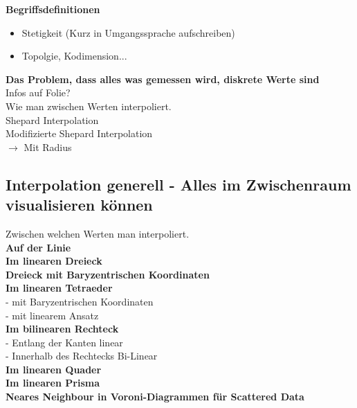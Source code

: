 \documentclass{article}
\begin{document}
\noindent \textbf{Begriffsdefinitionen}\\
\begin{itemize}[noitemsep]
	\item Stetigkeit (Kurz in Umgangssprache aufschreiben)
	\item Topolgie, Kodimension...
\end{itemize}

\noindent \textbf{Das Problem, dass alles was gemessen wird, diskrete Werte sind}\\
Infos auf Folie?\\
Wie man zwischen Werten interpoliert.\\


\noindent Shepard Interpolation\\

\noindent Modifizierte Shepard Interpolation\\
$\rightarrow$ Mit Radius

\subsection{Interpolation generell - Alles im Zwischenraum visualisieren können }
Zwischen welchen Werten man interpoliert.\\

\noindent \textbf{Auf der Linie}\\

\noindent \textbf{Im linearen Dreieck}\\

\noindent \textbf{Dreieck mit Baryzentrischen Koordinaten}\\

\noindent \textbf{Im linearen Tetraeder}\\
- mit Baryzentrischen Koordinaten\\
- mit linearem Ansatz\\

\noindent \textbf{Im bilinearen Rechteck}\\
- Entlang der Kanten linear\\
- Innerhalb des Rechtecks Bi-Linear\\

\noindent \textbf{Im linearen Quader}\\

\noindent \textbf{Im linearen Prisma}\\

\noindent \textbf{Neares Neighbour in Voroni-Diagrammen für Scattered Data}\\
\end{document}
